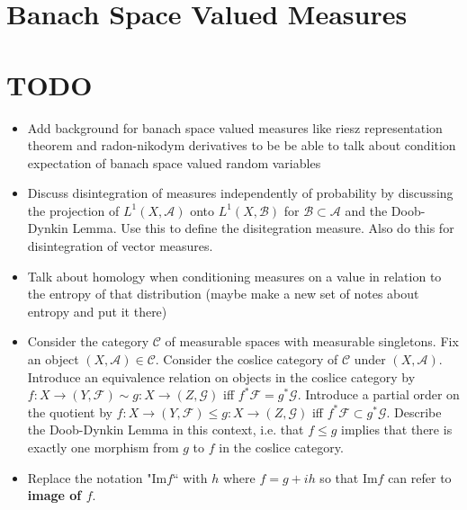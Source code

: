 \documentclass{book}
\theoremstyle{definition}
\newcommand{\MA}{\mathcal{A}}
\newcommand{\MB}{\mathcal{B}}
\newcommand{\MC}{\mathcal{C}}
\newcommand{\MF}{\mathcal{F}}
\newcommand{\MG}{\mathcal{G}}
\DeclareMathOperator*{\0}{\mbf{0}}
\DeclareMathOperator*{\1}{\mbf{1}}
\begin{document}
	
	
	
	
	
	
	\newpage
	\chapter{Banach Space Valued Measures}
	

























	\newpage
	\chapter{TODO}
	\begin{itemize}
		\item Add background for banach space valued measures like riesz representation theorem and radon-nikodym derivatives to be be able to talk about condition expectation of banach space valued random variables
		\item Discuss disintegration of measures independently of probability by discussing the projection of $L^1(X, \MA)$ onto $L^1(X, \MB)$ for $\MB \subset \MA$ and the Doob-Dynkin Lemma. Use this to define the disitegration measure. Also do this for disintegration of vector measures.
		\item Talk about homology when conditioning measures on a value in relation to the entropy of that distribution (maybe make a new set of notes about entropy and put it there)
		\item Consider the category $\MC$ of measurable spaces with measurable singletons. Fix an object $(X, \MA) \in \MC$. Consider the coslice category of $\MC$ under $(X, \MA)$. Introduce an equivalence relation on objects in the coslice category by $f:X \rightarrow (Y, \MF) \sim g: X \rightarrow (Z, \MG)$ iff $f^*\MF = g^*\MG$. Introduce a partial order on the quotient by $f:X \rightarrow (Y, \MF) \leq g: X \rightarrow (Z, \MG)$ iff $f^*\MF \subset g^*\MG$.  Describe the Doob-Dynkin Lemma in this context, i.e. that $f \leq g$ implies that there is exactly one morphism from $g$ to $f$ in the coslice category.
		\item  Replace the notation "$\text{Im} f$`` with $h$ where $f = g + ih$ so that $\text{Im}f$ can refer to \textbf{image of $f$}.
	\end{itemize}
\end{document}
